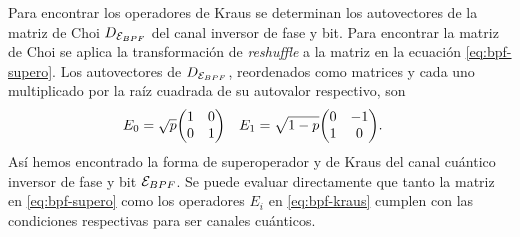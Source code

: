 Para encontrar los operadores de Kraus se determinan los autovectores
de la matriz de Choi $D_{\mathcal{E}_{BPF}}$ del canal inversor de fase y bit. 
Para encontrar la matriz de Choi se aplica la transformación 
de \textit{reshuffle} a la matriz en la ecuación \eqref{eq:bpf-supero}.
Los autovectores de $D_{\mathcal{E}_{BPF}}$, reordenados como matrices y
cada uno multiplicado por la raíz cuadrada de su autovalor respectivo, son
\begin{align}
E_0&=
\sqrt{p}
\mqty(
1 & 0\\
0 & 1
)&
E_1&=
\sqrt{1-p}
\mqty(
0 & -1\\
1 & 0
).
\label{eq:bpf-kraus}
\end{align}
Así hemos encontrado la forma de superoperador y de Kraus del canal
cuántico inversor de fase y bit $\mathcal{E}_{BPF}$. Se puede evaluar directamente que 
tanto la matriz en \eqref{eq:bpf-supero} como los operadores $E_i$
en \eqref{eq:bpf-kraus} cumplen con las condiciones respectivas
para ser canales cuánticos.

